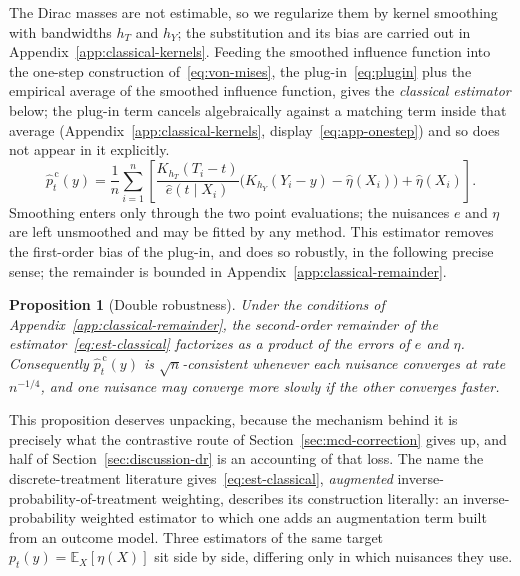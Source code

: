 \documentclass[11pt]{article}
\theoremstyle{plain}
\newtheorem{mypropo}{Proposition}
\theoremstyle{definition}
\theoremstyle{remark}
\newcommand{\pE}{\ensuremath{\mathbb{E}}}
\newcommand{\gps}{e}
\begin{document}
The Dirac masses are not estimable, so we regularize them by kernel smoothing with bandwidths
$h_T$ and $h_Y$; the substitution and its bias are carried out in
Appendix~\ref{app:classical-kernels}. Feeding the smoothed influence function into the
one-step construction of~\eqref{eq:von-mises}, the plug-in~\eqref{eq:plugin} plus the
empirical average of the smoothed influence function, gives the \emph{classical estimator}
below; the plug-in term cancels algebraically against a matching term inside that average
(Appendix~\ref{app:classical-kernels}, display~\eqref{eq:app-onestep}) and so does not appear
in it explicitly.
\begin{equation}
\widehat p^{\,\mathrm{c}}_t(y)
= \frac{1}{n}\sum_{i=1}^{n}
\left[ \frac{K_{h_T}(T_i-t)}{\widehat\gps(t \mid X_i)}
\Big( K_{h_Y}(Y_i-y) - \widehat\eta(X_i) \Big)
+ \widehat\eta(X_i) \right].
\label{eq:est-classical}
\end{equation}
Smoothing enters only through the two point evaluations; the nuisances $\gps$ and $\eta$ are
left unsmoothed and may be fitted by any method. This estimator removes the first-order bias
of the plug-in, and does so robustly, in the following precise sense; the remainder is bounded
in Appendix~\ref{app:classical-remainder}.

\begin{mypropo}[Double robustness]
\label{prop:dr-classical}
Under the conditions of Appendix~\ref{app:classical-remainder}, the second-order remainder of
the estimator~\eqref{eq:est-classical} factorizes as a product of the errors of $\gps$ and
$\eta$. Consequently $\widehat p^{\,\mathrm{c}}_t(y)$ is $\sqrt{n}$-consistent whenever each
nuisance converges at rate $n^{-1/4}$, and one nuisance may converge more slowly if the other
converges faster.
\end{mypropo}

This proposition deserves unpacking, because the mechanism behind it is precisely what the
contrastive route of Section~\ref{sec:mcd-correction} gives up, and half of
Section~\ref{sec:discussion-dr} is an accounting of that loss. The name the discrete-treatment
literature gives~\eqref{eq:est-classical}, \emph{augmented} inverse-probability-of-treatment
weighting, describes its construction literally: an inverse-probability weighted estimator to
which one adds an augmentation term built from an outcome model. Three estimators of the same
target $p_t(y) = \pE_X[\eta(X)]$ sit side by side, differing only in which nuisances they use.
\end{document}
